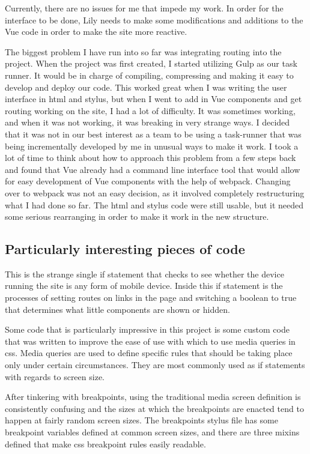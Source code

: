 \documentclass[draftclsnofoot,onecolumn,letterpaper,10pt,compsoc]{IEEEtran}
\begin{document}
Currently, there are no issues for me that impede my work.
In order for the interface to be done, Lily needs to make some modifications and additions to the Vue code in order to make the site more reactive.


The biggest problem I have run into so far was integrating routing into the project.
When the project was first created, I started utilizing Gulp as our task runner.
It would be in charge of compiling, compressing and making it easy to develop and deploy our code.
This worked great when I was writing the user interface in html and stylus, but when I went to add in Vue components and get routing working on the site, I had a lot of difficulty.
It was sometimes working, and when it was not working, it was breaking in very strange ways.
I decided that it was not in our best interest as a team to be using a task-runner that was being incrementally developed by me in unusual ways to make it work.
I took a lot of time to think about how to approach this problem from a few steps back and found that Vue already had a command line interface tool that would allow for easy development of Vue components with the help of webpack.
Changing over to webpack was not an easy decision, as it involved completely restructuring what I had done so far.
The html and stylus code were still usable, but it needed some serious rearranging in order to make it work in the new structure.



\subsection{Particularly interesting pieces of code}

This is the strange single if statement that checks to see whether the device running the site is any form of mobile device.
Inside this if statement is the processes of setting routes on links in the page and switching a boolean to true that determines what little components are shown or hidden.

\lstset{language=JavaScript}


Some code that is particularly impressive in this project is some custom code that was written to improve the ease of use with which to use media queries in css.
Media queries are used to define specific rules that should be taking place only under certain circumstances.
They are most commonly used as if statements with regards to screen size.


After tinkering with breakpoints, using the traditional media screen definition is consistently confusing and the sizes at which the breakpoints are enacted tend to happen at fairly random screen sizes.
The breakpoints stylus file has some breakpoint variables defined at common screen sizes, and there are three mixins defined that make css breakpoint rules easily readable.
\end{document}
